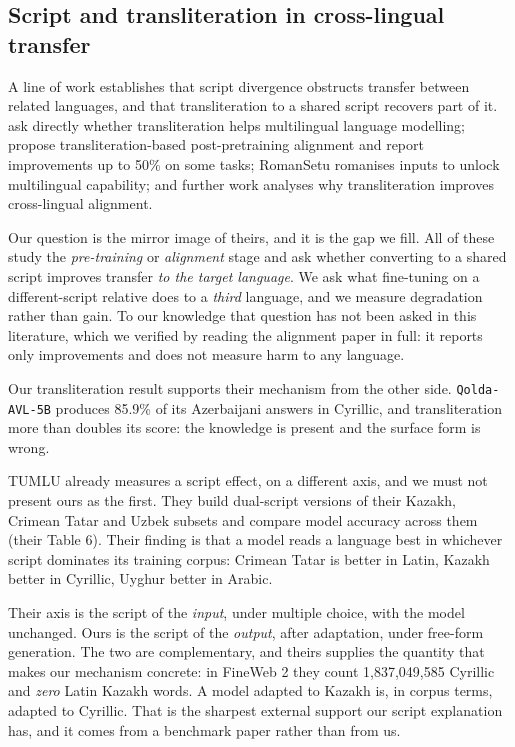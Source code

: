 \documentclass[final]{clv2025}
\begin{document}
\subsection{Script and transliteration in cross-lingual transfer}

A line of work establishes that script divergence obstructs transfer between
related languages, and that transliteration to a shared script recovers part of
it.  ask directly whether transliteration
helps multilingual language modelling;  propose
transliteration-based post-pretraining alignment and report improvements up to
50\% on some tasks; RomanSetu \cite{husain2024romansetu} romanises inputs to
unlock multilingual capability; and further work analyses why transliteration
improves cross-lingual alignment.

Our question is the mirror image of theirs, and it is the gap we fill. All of
these study the \emph{pre-training} or \emph{alignment} stage and ask whether
converting to a shared script improves transfer \emph{to the target language}.
We ask what fine-tuning on a different-script relative does to a \emph{third}
language, and we measure degradation rather than gain. To our knowledge that
question has not been asked in this literature, which we verified by reading
the alignment paper in full: it reports only improvements and does not measure
harm to any language.

Our transliteration result supports their mechanism from the other side.
\texttt{Qolda-AVL-5B} produces 85.9\% of its Azerbaijani answers in Cyrillic,
and transliteration more than doubles its score: the knowledge is present and
the surface form is wrong.

TUMLU already measures a script effect, on a different axis, and we must not
present ours as the first. They build dual-script versions of their Kazakh,
Crimean Tatar and Uzbek subsets and compare model accuracy across them (their
Table 6). Their finding is that a model reads a language best in whichever
script dominates its training corpus: Crimean Tatar is better in Latin, Kazakh
better in Cyrillic, Uyghur better in Arabic.

Their axis is the script of the \emph{input}, under multiple choice, with the
model unchanged. Ours is the script of the \emph{output}, after adaptation,
under free-form generation. The two are complementary, and theirs supplies the
quantity that makes our mechanism concrete: in FineWeb 2 they count
1,837,049,585 Cyrillic and \emph{zero} Latin Kazakh words. A model adapted to
Kazakh is, in corpus terms, adapted to Cyrillic. That is the sharpest external
support our script explanation has, and it comes from a benchmark paper rather
than from us.
\end{document}
